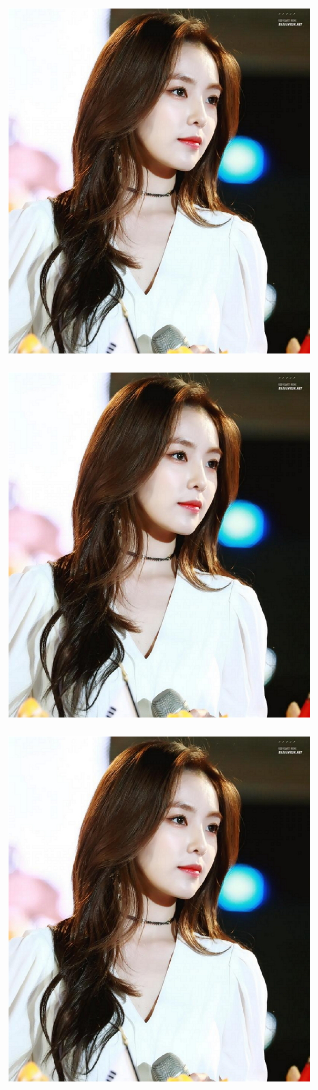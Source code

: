 \documentclass[11pt]{article}
\begin{document}
\begin{center}
\includegraphics[width=0.6\textwidth, page={1}]{RedVelvet}
\end{center}

\begin{center}
\includegraphics[width=0.6\textwidth, page={3}]{RedVelvet}
\end{center}

\begin{center}
\includegraphics[width=0.6\textwidth, page={5}]{RedVelvet}
\end{center}
\end{document}
